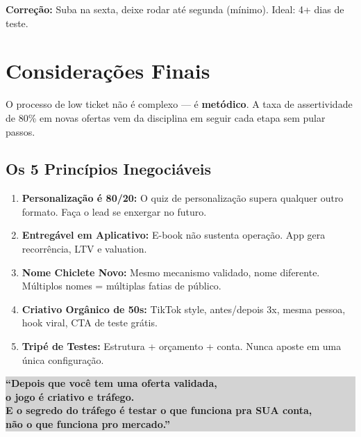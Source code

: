 \documentclass[12pt, a4paper]{article}
\begin{document}
\textbf{Correção:} Suba na sexta, deixe rodar até segunda (mínimo). Ideal: 4+ dias de teste.

\pagebreak

\section{Considerações Finais}

O processo de low ticket não é complexo --- é \textbf{metódico}. A taxa de assertividade de 80\% em novas ofertas vem da disciplina em seguir cada etapa sem pular passos.

\subsection{Os 5 Princípios Inegociáveis}

\begin{enumerate}
    \item \textbf{Personalização é 80/20:} O quiz de personalização supera qualquer outro formato. Faça o lead se enxergar no futuro.

    \item \textbf{Entregável em Aplicativo:} E-book não sustenta operação. App gera recorrência, LTV e valuation.

    \item \textbf{Nome Chiclete Novo:} Mesmo mecanismo validado, nome diferente. Múltiplos nomes = múltiplas fatias de público.

    \item \textbf{Criativo Orgânico de 50s:} TikTok style, antes/depois 3x, mesma pessoa, hook viral, CTA de teste grátis.

    \item \textbf{Tripé de Testes:} Estrutura + orçamento + conta. Nunca aposte em uma única configuração.
\end{enumerate}

\vspace{0.5cm}

\begin{center}
\colorbox{lightGray}{%
    \parbox{0.85\textwidth}{%
        \centering
        \vspace{0.3cm}
        \textcolor{primaryColor}{\textbf{``Depois que você tem uma oferta validada,}}\\
        \textcolor{primaryColor}{\textbf{o jogo é criativo e tráfego.}}\\
        \textcolor{primaryColor}{\textbf{E o segredo do tráfego é testar o que funciona pra SUA conta,}}\\
        \textcolor{primaryColor}{\textbf{não o que funciona pro mercado.''}}\\
        \vspace{0.3cm}
    }%
}
\end{center}
\end{document}
